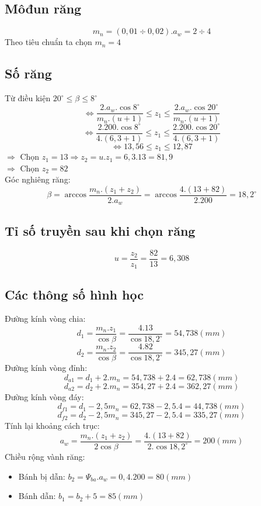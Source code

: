 \subsection{Môđun răng}
\[
    m_n = (0,01 \div 0,02).a_w = 2 \div 4
\]
Theo tiêu chuẩn ta chọn $m_n = 4$
\subsection{Số răng}
Từ điều kiện $20^\circ \leq \beta \leq 8^\circ$ \\
\[
    \Leftrightarrow \frac{2.a_w.\cos8^\circ}{m_n.(u+1)} \leq z_1 \leq \frac{2.a_w.\cos20^\circ}{m_n.(u+1)}
\]
\[
    \Leftrightarrow \frac{2.200.\cos8^\circ}{4.(6,3+1)} \leq z_1 \leq \frac{2.200.\cos20^\circ}{4.(6,3+1)}
\]
\[
    \Leftrightarrow 13,56 \leq z_1 \leq 12,87
\]
$\Rightarrow$ Chọn $z_1 = 13 \Rightarrow z_2 = u.z_1 = 6,3.13 = 81,9$ \\
$\Rightarrow$ Chọn $z_2 = 82$ \\
Góc nghiêng răng: 
\[
    \beta = \arccos\frac{m_n.(z_1+z_2)}{2.a_w} = \arccos\frac{4.(13+82)}{2.200} = 18,2^\circ
\]
\subsection{Tỉ số truyền sau khi chọn răng}
\[
    u = \frac{z_2}{z_1} = \frac{82}{13} = 6,308
\]
\subsection{Các thông số hình học}
Đường kính vòng chia: \\
\[
    d_1 = \frac{m_n.z_1}{\cos\beta} = \frac{4.13}{\cos18,2^\circ} = 54,738 (mm)
\]
\[
    d_2 = \frac{m_n.z_2}{\cos\beta} = \frac{4.82}{\cos18,2^\circ} = 345,27 (mm)
\]
Đường kính vòng đỉnh: \\
\[
    d_{a1} = d_1 + 2.m_n = 54,738 + 2.4 = 62,738 (mm)
\]
\[
    d_{a2} = d_2 + 2.m_n = 354,27 + 2.4 = 362,27 (mm)
\]
Đường kính vòng đáy: \\ 
\[
    d_{f1} = d_1 - 2,5m_n = 62,738 - 2,5.4 = 44,738 (mm)
\]
\[
    d_{f2} = d_2 - 2,5m_n = 345,27 - 2,5.4 = 335,27 (mm)
\]
Tính lại khoảng cách trục: \\
\[
    a_w = \frac{m_n.(z_1+z_2)}{2\cos\beta} = \frac{4.(13+82)}{2.\cos18,2^\circ} = 200(mm)
\]
Chiều rộng vành răng: 
\begin{itemize}
    \item Bánh bị dẫn: $b_2 = \Psi_{ba}.a_w = 0,4.200 = 80(mm)$
    \item Bánh dẫn: $b_1 = b_2 + 5 = 85(mm)$
\end{itemize}
